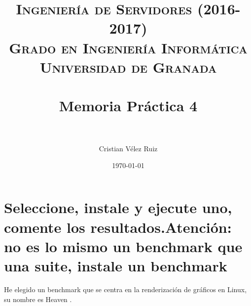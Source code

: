 
\usepackage{listings}
\usepackage{python}


\title{	
\normalfont \normalsize 
\textsc{\textbf{Ingeniería de Servidores (2016-2017)} \\ Grado en Ingeniería Informática \\ Universidad de Granada} \\ [25pt] %
\horrule{0.5pt} \\[0.4cm] %
\huge Memoria Práctica 4 \\ %
\horrule{2pt} \\[0.5cm] %
}

\author{Cristian Vélez Ruiz} %

\date{\normalsize\today} %



\maketitle %

\newpage %

\tableofcontents %

\listoffigures

\listoftables

\newpage

\section[Cuestión 1]{Seleccione, instale y ejecute uno, comente los resultados.Atención: no es lo mismo un benchmark que una suite, instale un benchmark}

He elegido un benchmark que se centra en la renderización de gráficos en Linux, su nombre es Heaven \cite{heaven}.

